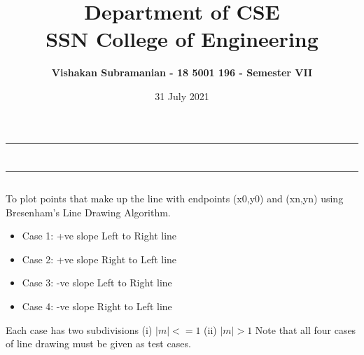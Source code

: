 \documentclass[12pt, a4]{article}
\title{\textbf{Department of CSE\\SSN College of Engineering}}
\author{\textbf{Vishakan Subramanian - 18 5001 196 - Semester VII}}
\date{31 July 2021}
\begin{document}
\maketitle
\hrule
\section*{}
\hrule
\bigskip

\subsection*{}
\subsection*{}
\begin{flushleft}
To plot points that make up the line with endpoints (x0,y0) and (xn,yn) using Bresenham’s Line Drawing Algorithm.

\begin{itemize}
\item Case 1: +ve slope Left to Right line
\item Case 2: +ve slope Right to Left line
\item Case 3: -ve slope Left to Right line
\item Case 4: -ve slope Right to Left line
\end{itemize}
Each case has two subdivisions
(i) $|m| <= 1$ (ii) $|m| > 1$
\newline
\newline
Note that all four cases of line drawing must be given as test cases. 
\end{flushleft}

\newpage
\subsection*{}
\begin{flushleft}

\end{flushleft}


\newpage
\end{document}
